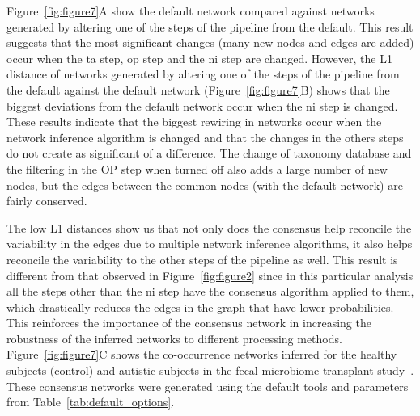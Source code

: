   Figure~\ref{fig:figure7}A show the default network compared against networks generated by altering one of the steps of the pipeline from the default.
  This result suggests that the most significant changes (many new nodes and edges are added) occur when the \ac{ta} step, \ac{op} step and the \ac{ni} step are changed.
  However, the L1 distance of networks generated by altering one of the steps of the pipeline from the default against the default network (Figure~\ref{fig:figure7}B) shows that the biggest deviations from the default network occur when the \ac{ni} step is changed.
  These results indicate that the biggest rewiring in networks occur when the network inference algorithm is changed and that the changes in the others steps do not create as significant of a difference.
  The change of taxonomy database and the filtering in the \ac{OP} step when turned off also adds a large number of new nodes, but the edges between the common nodes (with the default network) are fairly conserved.

  The low L1 distances show us that not only does the consensus help reconcile the variability in the edges due to multiple network inference algorithms, it also helps reconcile the variability to the other steps of the pipeline as well.
  This result is different from that observed in Figure~\ref{fig:figure2} since in this particular analysis all the steps other than the \ac{ni} step have the consensus algorithm applied to them, which drastically reduces the edges in the graph that have lower probabilities.
  This reinforces the importance of the consensus network in increasing the robustness of the inferred networks to different processing methods.
  Figure~\ref{fig:figure7}C shows the co-occurrence networks inferred for the healthy subjects (control) and autistic subjects in the fecal microbiome transplant study~\cite{Kang2017}.
  These consensus networks were generated using the default tools and parameters from Table~\ref{tab:default_options}.
